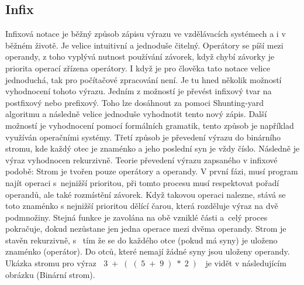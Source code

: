 \documentclass[12pt,a4paper]{report}
\begin{document}
\subsection{Infix}
Infixová notace je běžný způsob zápisu výrazu ve vzdělávacích systémech a i v běžném 
životě. Je velice intuitivní a jednoduše čitelný. Operátory se píší mezi operandy, z toho 
vyplývá nutnost používání závorek, když chybí závorky je priorita operací zřízena operátory. I když je pro člověka tato notace velice jednoduchá, tak pro počítačové zpracování není. Je tu hned několik možností vyhodnocení tohoto výrazu. Jedním z možností je převést infixový tvar na postfixový nebo prefixový. Toho lze dosáhnout za pomoci Shunting-yard \cite{výrazy} algoritmu a následně velice jednoduše vyhodnotit tento nový zápis. Další možností je vyhodnocení pomocí formálních gramatik, tento způsob je například využíván operačními systémy. Třetí způsob je převedení výrazu do binárního stromu, kde každý otec je znaménko a jeho poslední syn je vždy číslo. Následně je výraz vyhodnocen rekurzivně. 
\newline
\newline
Teorie převedení výrazu zapsaného v infixové podobě: 
\newline
Strom je tvořen pouze operátory a operandy. V první fázi, musí program najít operaci s~nejnižší prioritou, při tomto procesu musí respektovat pořadí operandů, ale také rozmístění závorek. Když takovou operaci nalezne, stává se toto znaménko s nejnižší prioritou dělící čarou, která rozděluje výraz na dvě podmnožiny. Stejná funkce je zavolána na obě vzniklé části a~celý proces pokračuje, dokud nezůstane jen jedna operace mezi dvěma operandy. Strom je stavěn rekurzivně, s~ tím že se do každého otce (pokud má syny) je uloženo znaménko (operátor). Do otců, které nemají žádné syny jsou uloženy operandy. Ukázka stromu pro výraz $\;\;3\;+\;(\;(\;5\;+\;9\;)\;*\;2\;)\;\;$ je vidět v následujícím obrázku (Binární strom).
\end{document}
